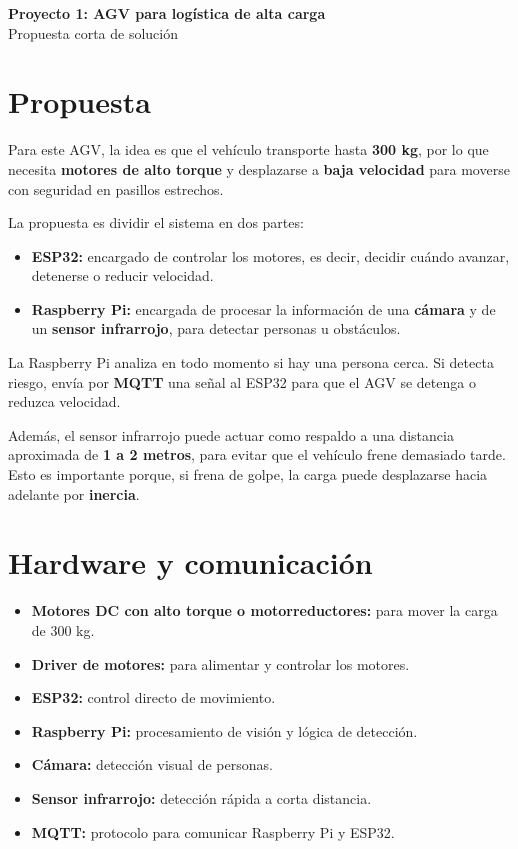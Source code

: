 \documentclass[12pt,letterpaper]{article}
\begin{document}
\begin{center}
    {\LARGE \textbf{Proyecto 1: AGV para logística de alta carga}}\\[0.3cm]
    {\large Propuesta corta de solución}
\end{center}

\section{Propuesta}

Para este AGV, la idea es que el vehículo transporte hasta \textbf{300 kg}, por lo que necesita \textbf{motores de alto torque} y desplazarse a \textbf{baja velocidad} para moverse con seguridad en pasillos estrechos.

La propuesta es dividir el sistema en dos partes:

\begin{itemize}[leftmargin=1.2cm]
    \item \textbf{ESP32:} encargado de controlar los motores, es decir, decidir cuándo avanzar, detenerse o reducir velocidad.
    \item \textbf{Raspberry Pi:} encargada de procesar la información de una \textbf{cámara} y de un \textbf{sensor infrarrojo}, para detectar personas u obstáculos.
\end{itemize}

La Raspberry Pi analiza en todo momento si hay una persona cerca. Si detecta riesgo, envía por \textbf{MQTT} una señal al ESP32 para que el AGV se detenga o reduzca velocidad.

Además, el sensor infrarrojo puede actuar como respaldo a una distancia aproximada de \textbf{1 a 2 metros}, para evitar que el vehículo frene demasiado tarde. Esto es importante porque, si frena de golpe, la carga puede desplazarse hacia adelante por \textbf{inercia}.

\section{Hardware y comunicación}

\begin{itemize}[leftmargin=1.2cm]
    \item \textbf{Motores DC con alto torque o motorreductores:} para mover la carga de 300 kg.
    \item \textbf{Driver de motores:} para alimentar y controlar los motores.
    \item \textbf{ESP32:} control directo de movimiento.
    \item \textbf{Raspberry Pi:} procesamiento de visión y lógica de detección.
    \item \textbf{Cámara:} detección visual de personas.
    \item \textbf{Sensor infrarrojo:} detección rápida a corta distancia.
    \item \textbf{MQTT:} protocolo para comunicar Raspberry Pi y ESP32.
\end{itemize}
\end{document}
